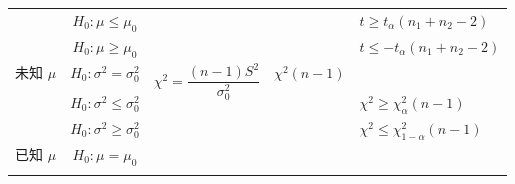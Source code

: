 \begin{table}[H]
{\begin{tabular}{ccccl}
                                                          & $H_0:\mu\leqslant \mu_0$             &                                                                                                                   &                                                                                  & $t\geqslant t_{\alpha}(n_1+n_2-2)$                    \\
                                                          & $H_0:\mu\geqslant \mu_0$             &                                                                                                                   &                                                                                  & $t\leqslant -t_{\alpha}(n_1+n_2-2)$                   \\
            \midrule
            \multirow{3}{*}{未知 $\mu$}                   & $H_0:\sigma^2=\sigma_0^2$            & \multirow{3}{*}{$\chi^2=\dfrac{(n-1)S^2}{\sigma_0^2}$}                                                            & \multirow{3}{*}{$\chi^2(n-1)$}                                                   & \makecell[l]{$\chi^2\geqslant \chi^2_{\alpha/2}(n-1)$ \\ $\chi^2\leqslant \chi_{1-\frac{\alpha}{2}}^2(n-1)$} \\
                                                          & $H_0:\sigma^2\leqslant \sigma_0^2$   &                                                                                                                   &                                                                                  & $\chi^2\geqslant \chi^2_\alpha(n-1)$                  \\
                                                          & $H_0:\sigma^2\geqslant \sigma_0^2$   &                                                                                                                   &                                                                                  & $\chi^2\leqslant \chi^2_{1-\alpha}(n-1)$              \\
            \midrule
            \multirow{3}{*}{已知 $\mu$}                   & $H_0:\mu=\mu_0$                      &                                                                                                                   &                                                                                  & \makecell[l]{$\chi^2\geqslant \chi^2_{\alpha/2}(n)$   \\ $\chi^2\leqslant \chi_{1-\frac{\alpha}{2}}^2(n)$} \\

\end{tabular}}
\end{table}
